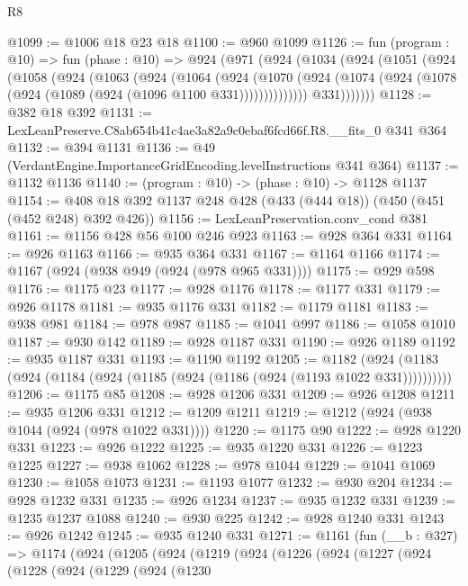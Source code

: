 \begin{lexlean}{R8}
\begin{coremodule}
@1099 := @1006 @18 @23 @18
@1100 := @960 @1099
@1126 := fun (program : @10) =>
  fun (phase : @10) =>
  @924
    (@971
      (@924
        (@1034
          (@924
            (@1051
              (@924
                (@1058
                  (@924
                    (@1063
                      (@924
                        (@1064
                          (@924
                            (@1070
                              (@924
                                (@1074
                                  (@924 (@1078 (@924 (@1089 (@924 (@1096 @1100 @331))))))))))))))
                  @331)))))))
@1128 := @382 @18 @392
@1131 := LexLeanPreserve.C8ab654b41c4ae3a82a9c0ebaf6fcd66f.R8.__fits_0 @341 @364
@1132 := @394 @1131
@1136 := @49 (VerdantEngine.ImportanceGridEncoding.levelInstructions @341 @364)
@1137 := @1132 @1136
@1140 := (program : @10) -> (phase : @10) -> @1128 @1137
@1154 := @408 @18 @392 @1137 @248 @428 (@433 (@444 @18)) (@450 (@451 (@452 @248) @392 @426))
@1156 := LexLeanPreservation.conv_cond @381
@1161 := @1156 @428 @56 @100 @246 @923
@1163 := @928 @364 @331
@1164 := @926 @1163
@1166 := @935 @364 @331
@1167 := @1164 @1166
@1174 := @1167 (@924 (@938 @949 (@924 (@978 @965 @331))))
@1175 := @929 @598
@1176 := @1175 @23
@1177 := @928 @1176
@1178 := @1177 @331
@1179 := @926 @1178
@1181 := @935 @1176 @331
@1182 := @1179 @1181
@1183 := @938 @981
@1184 := @978 @987
@1185 := @1041 @997
@1186 := @1058 @1010
@1187 := @930 @142
@1189 := @928 @1187 @331
@1190 := @926 @1189
@1192 := @935 @1187 @331
@1193 := @1190 @1192
@1205 := @1182 (@924 (@1183 (@924 (@1184 (@924 (@1185 (@924 (@1186 (@924 (@1193 @1022 @331))))))))))
@1206 := @1175 @85
@1208 := @928 @1206 @331
@1209 := @926 @1208
@1211 := @935 @1206 @331
@1212 := @1209 @1211
@1219 := @1212 (@924 (@938 @1044 (@924 (@978 @1022 @331))))
@1220 := @1175 @90
@1222 := @928 @1220 @331
@1223 := @926 @1222
@1225 := @935 @1220 @331
@1226 := @1223 @1225
@1227 := @938 @1062
@1228 := @978 @1044
@1229 := @1041 @1069
@1230 := @1058 @1073
@1231 := @1193 @1077
@1232 := @930 @204
@1234 := @928 @1232 @331
@1235 := @926 @1234
@1237 := @935 @1232 @331
@1239 := @1235 @1237 @1088
@1240 := @930 @225
@1242 := @928 @1240 @331
@1243 := @926 @1242
@1245 := @935 @1240 @331
@1271 := @1161
    (fun (__b : @327) =>
    @1174
      (@924
        (@1205
          (@924
            (@1219
              (@924
                (@1226
                  (@924
                    (@1227
                      (@924
                        (@1228
                          (@924
                            (@1229
                              (@924
                                (@1230

\end{coremodule}
\end{lexlean}
